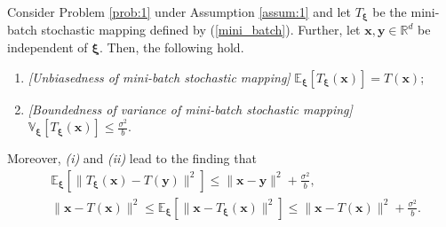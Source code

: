 \documentclass[smallextended,referee,envcountsect,]{svjour3}
\begin{document}
\begin{proposition}\label{prop:1}
Consider Problem \ref{prob:1} under Assumption \ref{assum:1} and let $T_{\bm{\xi}}$ be the mini-batch stochastic mapping defined by (\ref{mini_batch}). Further, let $\bm{x}, \bm{y} \in \mathbb{R}^d$ be independent of $\bm{\xi}$. Then, the following hold.
\begin{enumerate}
\item[{\em (i)}] {\em [Unbiasedness of mini-batch stochastic mapping]} $\displaystyle{\mathbb{E}_{\bm{\xi}}[T_{\bm{\xi}}(\bm{x})] = T(\bm{x})}$;
\item[{\em (ii)}] {\em [Boundedness of variance of mini-batch stochastic mapping]} $\displaystyle{\mathbb{V}_{\bm{\xi}}[T_{\bm{\xi}} (\bm{x})] \leq \frac{\sigma^2}{b}}$.
\end{enumerate}
Moreover, {\em (i)} and {\em (ii)} lead to the finding that 
\begin{align}
&\mathbb{E}_{\bm{\xi}} \left[ \| T_{\bm{\xi}}(\bm{x}) - T(\bm{y}) \|^2 \right]
\leq 
\|\bm{x} - \bm{y} \|^2 
+ 
\frac{\sigma^2}{b}, \label{app_nonexp}\\
&
\|\bm{x} - T (\bm{x})\|^2
\leq
\mathbb{E}_{\bm{\xi}} \left[ \| \bm{x} - T_{\bm{\xi}}(\bm{x}) \|^2 \right] 
\leq \|\bm{x} - T (\bm{x})\|^2 + \frac{\sigma^2}{b}. \label{app_nonexp_1}
\end{align}
\end{proposition}
\end{document}

